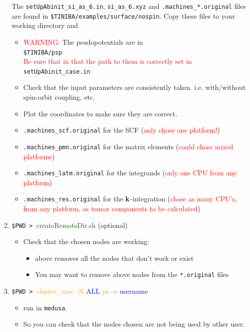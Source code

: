\documentclass[openany,oneside]{book}
\numberwithin{equation}{section}
\begin{document}
\begin{enumerate}
The 
\verb=setUpAbinit_si_as_6.in=, \verb=si_as_6.xyz= and
\verb=.machines_*.original= files are found in
\verb=$TINIBA/examples/surface/nospin=. Copy these files to your
working directory and
\begin{itemize}
\item \textcolor{red}{WARNING}: The psudopotentials are in\\
\verb=$TINIBA/psp=\\
\textcolor{red}{Be sure that in that the path to them is correctly set
in}\\
 \verb=setUpAbinit_case.in= 
\item {\small Check that the input parameters are consistently
    taken. i.e. with/without spin-orbit coupling, etc.}
\item {\small Plot the coordinates to make sure they are correct.}
\item \verb=.machines_scf.original= 
for the SCF (\textcolor{red}{only chose one
 platform!})
\item \verb=.machines_pmn.original= for the matrix elements (\textcolor{red}{could chose mixed platforms})
\item \verb=.machines_latm.original= for the integrands (\textcolor{red}{only one CPU from any platform})
\item \verb=.machines_res.original= for the $\mathbf{k}$-integration
  (\textcolor{red}{chose as many CPU's, from any platform,
as tensor components to be calculated})
\end{itemize}
\item \verb=$PWD > =\textcolor{darkgreen}{createRemoteDir.sh} (optional)
\begin{itemize}
\item Check that the chosen nodes are working:
\begin{itemize}
\item above removes all the nodes that  don't work or exist
\item You may want to remove above nodes from the \verb=*.original= files
\end{itemize}
\end{itemize}
\item{\small \verb=$PWD > =\textcolor{orange}{cluster\_exec -N}
   \textcolor{blue}{ALL} \textcolor{orange}{ps -u} \textcolor{blue}{username}
}
\begin{itemize}
\item {\small run in \verb=medusa=.}
\item {\small So you can check that the nodes chosen are not being used by other user.}

\end{itemize}
\end{enumerate}
\end{document}
